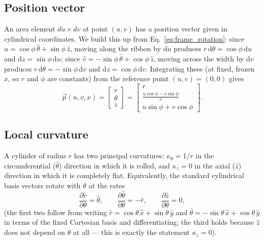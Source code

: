\documentclass[11pt]{article}
\begin{document}
\subsection{Position vector}\label{sec:position}
An area element $du \times dv$ at point $(u,v)$ has a position vector given in cylindrical coordinates. We build this up from Eq.~\eqref{eq:frame_rotation}: since $\hat u = \cos\phi\,\hat\theta+\sin\phi\,\hat z$, moving along the ribbon by $\mathrm du$ produces $r\,\mathrm d\theta = \cos\phi\,\mathrm du$ and $\mathrm dz = \sin\phi\,\mathrm du$; since $\hat v = -\sin\phi\,\hat\theta + \cos\phi\,\hat z$, moving across the width by $\mathrm dv$ produces $r\,\mathrm d\theta = -\sin\phi\,\mathrm dv$ and $\mathrm dz=\cos\phi\,\mathrm dv$. Integrating these (at fixed, frozen $x$, so $r$ and $\phi$ are constants) from the reference point $(u,v)=(0,0)$ gives
\begin{equation}\label{eq:position}
    \vec{p}(u,v,x) =
    \begin{bmatrix}
        r\\
        \theta\\
        z
    \end{bmatrix} =
    \begin{bmatrix}
        r\\
        \frac{u \cos\phi - v \sin\phi}{r}\\
        u \sin\phi + v \cos\phi
    \end{bmatrix}.
\end{equation}

\subsection{Local curvature}\label{sec:local_curvature}
A cylinder of radius $r$ has two principal curvatures: $\kappa_\theta = 1/r$ in the circumferential ($\hat\theta$) direction in which it is rolled, and $\kappa_z = 0$ in the axial ($\hat z$) direction in which it is completely flat. Equivalently, the standard cylindrical basis vectors rotate with $\theta$ at the rates
\begin{equation}\label{eq:cyl_basis_deriv}
    \frac{\partial\hat r}{\partial\theta} = \hat\theta, \qquad
    \frac{\partial\hat\theta}{\partial\theta} = -\hat r, \qquad
    \frac{\partial\hat z}{\partial\theta} = 0,
\end{equation}
(the first two follow from writing $\hat r=\cos\theta\,\hat x+\sin\theta\,\hat y$ and $\hat\theta=-\sin\theta\,\hat x+\cos\theta\,\hat y$ in terms of the fixed Cartesian basis and differentiating; the third holds because $\hat z$ does not depend on $\theta$ at all --- this is exactly the statement $\kappa_z=0$).
\end{document}
